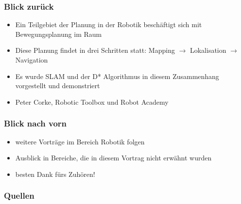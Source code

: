 \documentclass{beamer}
\begin{document}
\begin{frame}
\frametitle{Blick zurück}
\begin{itemize}

\item Ein Teilgebiet der Planung in der Robotik beschäftigt sich mit Bewegungsplanung im Raum
\item Diese Planung findet in drei Schritten statt: Mapping $\rightarrow$ Lokalisation $\rightarrow$ Navigation
\item Es wurde SLAM und der D* Algorithmus in diesem Zusammenhang vorgestellt und demonstriert
\item Peter Corke, Robotic Toolbox und Robot Academy


\end{itemize}
\end{frame}

\begin{frame}
\frametitle{Blick nach vorn}
\begin{itemize}
\item weitere Vorträge im Bereich Robotik folgen
\item Ausblick in Bereiche, die in diesem Vortrag nicht erwähnt wurden
\item besten Dank fürs Zuhören!

\end{itemize}
\end{frame}


\begin{frame}
\frametitle{Quellen}
\begin{columns}[T]
\begin{column}[T]{5cm}

\end{column}

\begin{column}[T]{5cm}
 \begin{figure}[h]
\centering
 \end{figure}
\end{column}

\end{columns}
\end{frame}
\end{document}
